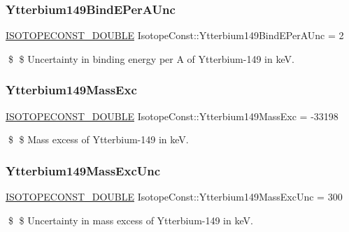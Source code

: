 \subsubsection{\texorpdfstring{Ytterbium149\+Bind\+E\+Per\+A\+Unc}{Ytterbium149BindEPerAUnc}}
{\footnotesize\ttfamily \mbox{\hyperlink{group___isotope_const-_macros_ga8f45a7272ce02c0b4c65c44636ed719a}{I\+S\+O\+T\+O\+P\+E\+C\+O\+N\+S\+T\+\_\+\+D\+O\+U\+B\+LE}} Isotope\+Const\+::\+Ytterbium149\+Bind\+E\+Per\+A\+Unc = 2}

\$ \$ Uncertainty in binding energy per A of Ytterbium-\/149 in keV. \mbox{\label{group___isotope_const-_ytterbium-_yb149_ga4fc286f03484e86713f008d16905f20d}} 
\subsubsection{\texorpdfstring{Ytterbium149\+Mass\+Exc}{Ytterbium149MassExc}}
{\footnotesize\ttfamily \mbox{\hyperlink{group___isotope_const-_macros_ga8f45a7272ce02c0b4c65c44636ed719a}{I\+S\+O\+T\+O\+P\+E\+C\+O\+N\+S\+T\+\_\+\+D\+O\+U\+B\+LE}} Isotope\+Const\+::\+Ytterbium149\+Mass\+Exc = -\/33198}

\$ \$ Mass excess of Ytterbium-\/149 in keV. \mbox{\label{group___isotope_const-_ytterbium-_yb149_gae5847fb467831c064f9be7a4484bcb57}} 
\subsubsection{\texorpdfstring{Ytterbium149\+Mass\+Exc\+Unc}{Ytterbium149MassExcUnc}}
{\footnotesize\ttfamily \mbox{\hyperlink{group___isotope_const-_macros_ga8f45a7272ce02c0b4c65c44636ed719a}{I\+S\+O\+T\+O\+P\+E\+C\+O\+N\+S\+T\+\_\+\+D\+O\+U\+B\+LE}} Isotope\+Const\+::\+Ytterbium149\+Mass\+Exc\+Unc = 300}

\$ \$ Uncertainty in mass excess of Ytterbium-\/149 in keV. \mbox{\label{group___isotope_const-_ytterbium-_yb149_ga008db9dec8fef469076b15cca37c7878}} 
